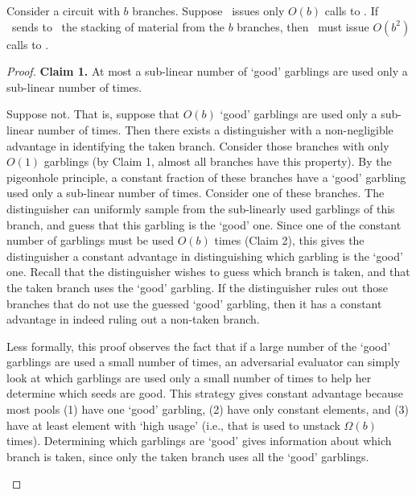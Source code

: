 \begin{theorem}
Consider a circuit with $b$ branches.  Suppose \Gen\ issues only
$O(b)$ calls to \Ev. If \Gen\ sends to \Eval\ the stacking of material from
the $b$ branches, then \Gen\ must issue $O(b^2)$  calls to \Gb.
\end{theorem}
\begin{proof}

\textbf{Claim 1.} At most a sub-linear number of
`good' garblings are used only a sub-linear number of times.
  \begin{subproof}
    Suppose not.
    That is, suppose that $O(b)$ `good' garblings are used only a
    sub-linear number of times.
    Then there exists a distinguisher with a non-negligible advantage
    in identifying the taken branch.
    Consider those branches with
    only $O(1)$ garblings (by Claim 1, almost all branches have this
    property). By the pigeonhole principle, a constant fraction of
    these branches have a `good' garbling used only a sub-linear
    number of times. Consider one of these branches. The distinguisher
    can uniformly sample from the sub-linearly used garblings of this
    branch, and guess that this garbling is the `good' one. Since one
    of the constant number of garblings must be used $O(b)$ times
    (Claim 2), this gives the distinguisher a constant advantage in
    distinguishing which garbling is the `good' one. Recall that the
    distinguisher wishes to guess which branch is taken, and that the
    taken branch uses the `good' garbling. If the distinguisher rules
    out those branches that do not use the guessed `good' garbling,
    then it has a constant advantage in indeed ruling out a non-taken
    branch.

    Less formally, this proof observes the fact that if a large number
    of the `good' garblings are used a small number of times, an
    adversarial evaluator can simply look at which garblings are used
    only a small number of times to help her determine which seeds are
    good.
    This strategy gives constant advantage because most pools (1) have
    one `good' garbling, (2) have only constant elements, and (3) have
    at least element with `high usage' (i.e., that is used to unstack
    $\Omega(b)$ times).
    Determining which garblings are `good' gives information about which
    branch is taken, since only the taken branch uses all the `good'
    garblings.
  \end{subproof}
\end{proof}
